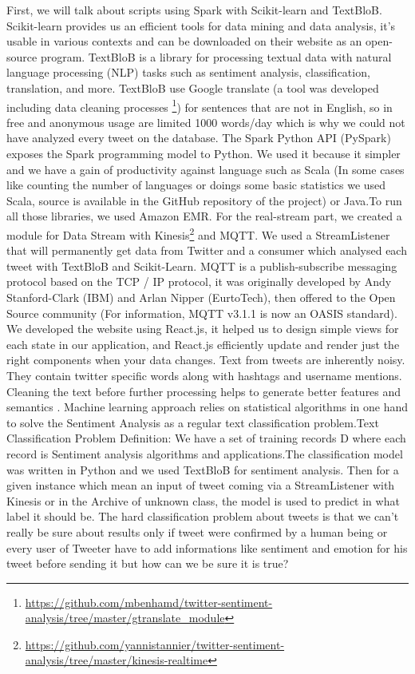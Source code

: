 \documentclass{acmtog} %
\begin{document}
First, we will talk about scripts using Spark with Scikit-learn and TextBloB. Scikit-learn provides us an efficient tools for data mining and data analysis, it’s usable in various contexts and can be downloaded on their website as an open-source program. TextBloB is a library for processing textual data with natural language processing (NLP) \cite{Saif12} tasks such as sentiment analysis, classification, translation, and more. TextBloB use Google translate (a tool was developed including data cleaning processes \footnote{\url{https://github.com/mbenhamd/twitter-sentiment-analysis/tree/master/gtranslate_module}}) for sentences that are not in English, so in free and anonymous usage are limited 1000 words/day which is why we could not have analyzed every tweet on the database. The Spark Python API (PySpark) exposes the Spark programming model to Python. We used it because it simpler and we have a gain of productivity against language such as Scala (In some cases like counting the number of languages or doings some basic statistics we used Scala, source is available in the GitHub repository of the project) or Java.To run all those libraries, we used Amazon EMR. For the real-stream part, we created a module for Data Stream with Kinesis\footnote{\url{https://github.com/yannistannier/twitter-sentiment-analysis/tree/master/kinesis-realtime}} and MQTT. We used a StreamListener that will permanently get data from Twitter and a consumer which analysed each tweet with TextBloB and Scikit-Learn.
MQTT is a publish-subscribe messaging protocol based on the TCP / IP protocol, it was originally developed by Andy Stanford-Clark (IBM) and Arlan Nipper (EurtoTech), then offered to the Open Source community (For information, MQTT v3.1.1 is now an OASIS standard). We developed the website using React.js, it helped us to design simple views for each state in our application, and React.js efficiently update and render just the right components when your data changes. Text from tweets are inherently noisy. They contain twitter specific words along with hashtags and username mentions. Cleaning the text before further processing helps to generate better features and semantics \cite{Saif12}.
Machine learning approach relies on statistical algorithms in one hand to solve the Sentiment Analysis as a regular text classification problem.Text Classification Problem Definition: We have a set of training records D where each record is Sentiment analysis algorithms and applications.The classification model was written in Python and we used TextBloB for sentiment analysis. Then for a given instance which mean an input of tweet coming via a StreamListener with Kinesis or in the Archive of unknown class, the model is used to predict in what label it should be. The hard classification problem about tweets is that we can't really be sure about results only if tweet were confirmed by a human being or every user of Tweeter have to add informations like sentiment and emotion for his tweet before sending it but how can we be sure it is true?
\end{document}

